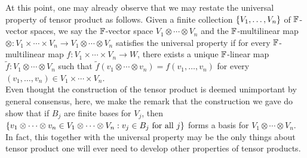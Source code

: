 \documentclass{report}
\begin{document}
At this point, one may already observe that we may restate the universal property of tensor product as follows. Given a finite collection $\{ V_1,\dots ,V_n \}$ of $\mathbb{F}$-vector spaces, we say the $\mathbb{F}$-vector space $V_1\otimes  \cdots \otimes  V_n$ and the $\mathbb{F}$-multilinear map $\otimes  :V_1\times \cdots \times V_n \rightarrow V_1 \otimes  \cdots \otimes  V_n$ satisfies the universal property if for every $\mathbb{F}$-multilinear map  $f:V_1\times \cdots \times V_n \rightarrow W$, there exists a unique $\mathbb{F}$-linear map  $\tilde{f}:V_1 \otimes  \cdots \otimes  V_n$ such that $\tilde{f}(v_1\otimes  \cdots \otimes  v_n)=f(v_1,\dots ,v_n)$ for every  $(v_1,\dots ,v_n)\in V_1 \times \cdots \times V_n$.  \\

Even thought the construction of the tensor product is deemed unimportant by general consensus, here, we make the remark that the construction we gave do show that if $B_j$ are finite bases for $V_j$, then  $\{ v_1\otimes \cdots \otimes  v_n \in V_1 \otimes  \cdots \otimes  V_n: v_j \in B_j\text{ for all }j \}$ forms a basis for $V_1\otimes  \cdots \otimes  V_n$. In fact, this together with the universal property may be the only things about tensor product one will ever need to develop other properties of tensor products. 
\end{document}
